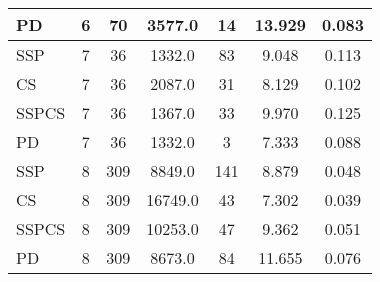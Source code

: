 \documentclass{article}
\begin{document}
\begin{table}[H]
{\begin{tabular}{|l|c|c|c|c|c|c|}
PD                 & 6              & 70                & 3577.0                 & 14             & 13.929                   & 0.083                                  \\ \hline
SSP                & 7              & 36                & 1332.0                 & 83             & 9.048                    & 0.113                                  \\ \hline
CS                 & 7              & 36                & 2087.0                 & 31             & 8.129                    & 0.102                                  \\ \hline
SSPCS              & 7              & 36                & 1367.0                 & 33             & 9.970                    & 0.125                                  \\ \hline
PD                 & 7              & 36                & 1332.0                 & 3              & 7.333                    & 0.088                                  \\ \hline
SSP                & 8              & 309               & 8849.0                 & 141            & 8.879                    & 0.048                                  \\ \hline
CS                 & 8              & 309               & 16749.0                & 43             & 7.302                    & 0.039                                  \\ \hline
SSPCS              & 8              & 309               & 10253.0                & 47             & 9.362                    & 0.051                                  \\ \hline
PD                 & 8              & 309               & 8673.0                 & 84             & 11.655                   & 0.076                                  \\ \hline
\end{tabular}%
}
\label{tab:simulation1_algorithm_metrics}
\end{table}
\end{document}
